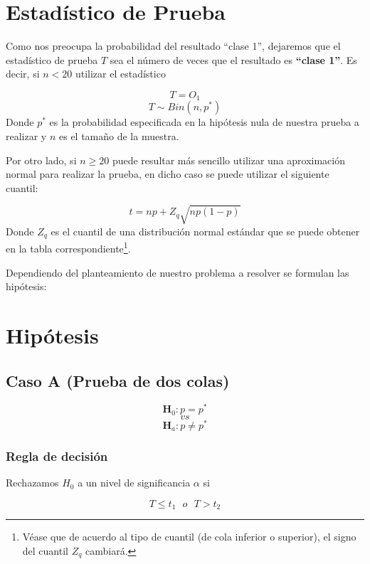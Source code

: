 \documentclass[
  a4paper,
  oneside,
  openany]{book}
\begin{document}
\hypertarget{estaduxedstico-de-prueba}{%
\section{Estadístico de Prueba}\label{estaduxedstico-de-prueba}}

Como nos preocupa la probabilidad del resultado ``clase 1'', dejaremos que el estadístico de prueba \(T\) sea el número de veces que el resultado es \textbf{``clase 1''}.
Es decir, si \(n<20\) utilizar el estadístico

\[T=O_{1}\]
\[ T \sim Bin (n,p^*)\]
Donde \(p^*\) es la probabilidad especificada en la hipótesis nula de nuestra prueba a realizar y \(n\) es el tamaño de la muestra.

Por otro lado, si \(n\geq20\) puede resultar más sencillo utilizar una aproximación normal para realizar la prueba, en dicho caso se puede utilizar el siguiente cuantil:

\[t=np+Z_{q}\sqrt{np(1-p)}\]
Donde \(Z_{q}\) es el cuantil de una distribución normal estándar que se puede obtener en la tabla correspondiente\footnote{Véase que de acuerdo al tipo de cuantil (de cola inferior o superior), el signo del cuantil \(Z_q\) cambiará.}.

Dependiendo del planteamiento de nuestro problema a resolver se formulan las hipótesis:

\hypertarget{hipuxf3tesis}{%
\section{Hipótesis}\label{hipuxf3tesis}}

\hypertarget{caso-a-prueba-de-dos-colas}{%
\subsection*{Caso A (Prueba de dos colas)}\label{caso-a-prueba-de-dos-colas}}


\[\textbf{H}_0: p = p^*\]
\[vs\]
\[\textbf{H}_a: p \neq p^*\]

\hypertarget{regla-de-decisiuxf3n}{%
\subsubsection*{Regla de decisión}\label{regla-de-decisiuxf3n}}


Rechazamos \(H_0\) a un nivel de significancia \(\alpha\) si

\[T \leq t_{1} \ \ \ o \ \ \ T > t_{2}\]
\end{document}
